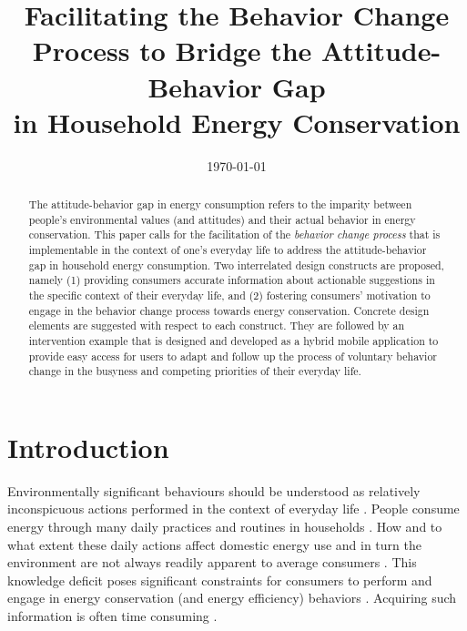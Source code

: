 \documentclass[a4paper]{article}
\title{
\large{Facilitating the Behavior Change Process to Bridge the Attitude-Behavior Gap \\ in Household Energy Conservation}
}
\date{\today}
\begin{document}
\maketitle

\begin{abstract}
The attitude-behavior gap in energy consumption refers to the imparity between people's environmental values (and attitudes) and their actual behavior in energy conservation. This paper calls for the facilitation of the \textit{behavior change process} that is implementable in the context of one's everyday life to address the attitude-behavior gap in household energy consumption. Two interrelated design constructs are proposed, namely (1) providing consumers accurate information about actionable suggestions in the specific context of their everyday life, and (2) fostering consumers' motivation to engage in the behavior change process towards energy conservation. Concrete design elements are suggested with respect to each construct. They are followed by an intervention example that is designed and developed as a hybrid mobile application to provide easy access for users to adapt and follow up the process of voluntary behavior change in the busyness and competing priorities of their everyday life.  
\end{abstract}

\section{Introduction}
\label{sec:intro}

Environmentally significant behaviours should be understood as relatively inconspicuous actions performed in the context of everyday life \citep{Burgess2008}. People consume energy through many daily practices and routines in households \citep{Burgess2008,Hargreaves2010, Fehrenbacher2011,Burchell2014}. How and to what extent these daily actions affect domestic energy use and in turn the environment are not always readily apparent to average consumers \citep{Burgess2008,Delmas2013}. This knowledge deficit poses significant constraints for consumers to perform and engage in energy conservation (and energy efficiency) behaviors \citep{Schultz2002,Burchell2014}. Acquiring such information is often time consuming \citep{Delmas2013}. 
\end{document}
